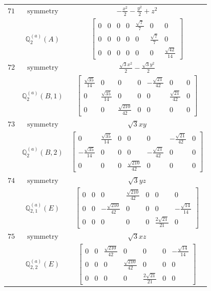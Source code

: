 \documentclass[fleqn,8pt,landscape]{jsarticle}
\begin{document}
\begin{longtable}{ccc}
$ 71 $ & $ \text{symmetry} $ & $ - \frac{x^{2}}{2} - \frac{y^{2}}{2} + z^{2} $ \\
$  $ & $ \mathbb{Q}_{2}^{(a)}(A) $ & $ \begin{bmatrix} 0 & 0 & 0 & 0 & \frac{\sqrt{7}}{7} & 0 & 0 \\ 0 & 0 & 0 & 0 & 0 & \frac{\sqrt{7}}{7} & 0 \\ 0 & 0 & 0 & 0 & 0 & 0 & \frac{\sqrt{42}}{14} \end{bmatrix} $ \\ \hline
$ 72 $ & $ \text{symmetry} $ & $ \frac{\sqrt{3} x^{2}}{2} - \frac{\sqrt{3} y^{2}}{2} $ \\
$  $ & $ \mathbb{Q}_{2}^{(a)}(B,1) $ & $ \begin{bmatrix} \frac{\sqrt{35}}{14} & 0 & 0 & 0 & - \frac{\sqrt{21}}{42} & 0 & 0 \\ 0 & \frac{\sqrt{35}}{14} & 0 & 0 & 0 & \frac{\sqrt{21}}{42} & 0 \\ 0 & 0 & \frac{\sqrt{210}}{42} & 0 & 0 & 0 & 0 \end{bmatrix} $ \\ \hline
$ 73 $ & $ \text{symmetry} $ & $ \sqrt{3} x y $ \\
$  $ & $ \mathbb{Q}_{2}^{(a)}(B,2) $ & $ \begin{bmatrix} 0 & \frac{\sqrt{35}}{14} & 0 & 0 & 0 & - \frac{\sqrt{21}}{42} & 0 \\ - \frac{\sqrt{35}}{14} & 0 & 0 & 0 & - \frac{\sqrt{21}}{42} & 0 & 0 \\ 0 & 0 & 0 & \frac{\sqrt{210}}{42} & 0 & 0 & 0 \end{bmatrix} $ \\ \hline
$ 74 $ & $ \text{symmetry} $ & $ \sqrt{3} y z $ \\
$  $ & $ \mathbb{Q}_{2,1}^{(a)}(E) $ & $ \begin{bmatrix} 0 & 0 & 0 & \frac{\sqrt{210}}{42} & 0 & 0 & 0 \\ 0 & 0 & - \frac{\sqrt{210}}{42} & 0 & 0 & 0 & - \frac{\sqrt{14}}{14} \\ 0 & 0 & 0 & 0 & 0 & \frac{2 \sqrt{21}}{21} & 0 \end{bmatrix} $ \\ \hline
$ 75 $ & $ \text{symmetry} $ & $ \sqrt{3} x z $ \\
$  $ & $ \mathbb{Q}_{2,2}^{(a)}(E) $ & $ \begin{bmatrix} 0 & 0 & \frac{\sqrt{210}}{42} & 0 & 0 & 0 & - \frac{\sqrt{14}}{14} \\ 0 & 0 & 0 & \frac{\sqrt{210}}{42} & 0 & 0 & 0 \\ 0 & 0 & 0 & 0 & \frac{2 \sqrt{21}}{21} & 0 & 0 \end{bmatrix} $ \\ \hline

\end{longtable}
\end{document}

